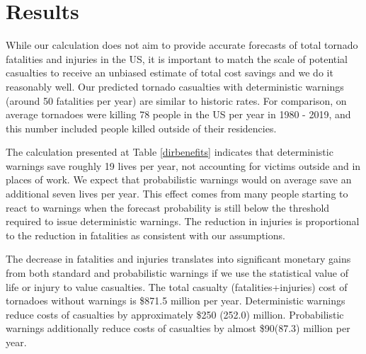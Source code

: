 \documentclass{ametsocV6.1}
\newcommand{\add}[1]{{\color{red}#1}}
\begin{document}
\section{Results}

While our calculation does not aim to provide accurate forecasts of total tornado fatalities and injuries in the US, it is important to match the scale of potential casualties to receive an unbiased estimate of total cost savings and we do it reasonably well.  Our predicted tornado casualties with deterministic warnings (around 50 fatalities per year) are similar to historic rates. For comparison, on average tornadoes were killing 78 people in the US per year in 1980 - 2019, and this number included people killed outside of their residencies.  

The calculation presented at Table \ref{dirbenefits} indicates that deterministic warnings save roughly \add{19} lives per year, not accounting for victims outside and in places of work. We expect that probabilistic warnings would on average save an additional seven lives per year. This effect comes from many people starting to react to warnings when the forecast probability is still below the threshold required to issue deterministic warnings. The reduction in injuries is proportional to the reduction in fatalities as consistent with our assumptions.

The decrease in fatalities and injuries translates into significant monetary gains from both standard and probabilistic warnings if we use the statistical value of life or injury to value casualties. The total casualty (fatalities+injuries) cost of tornadoes without warnings is \$871.5 million per year. Deterministic warnings reduce costs of casualties by \add{approximately \$250 (252.0)} million. Probabilistic warnings additionally reduce costs of casualties by almost \$90(87.3) million per year.


\end{document}
